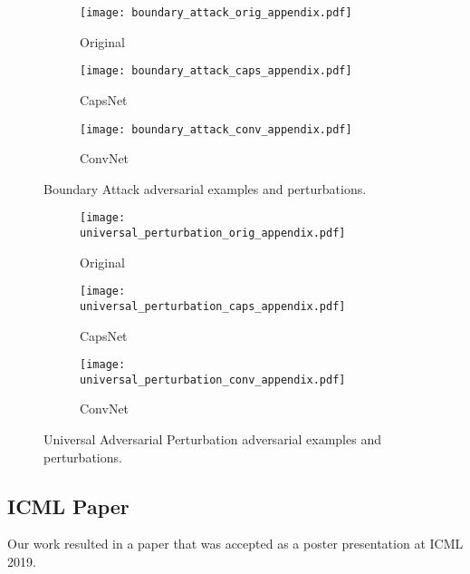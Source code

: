 \begin{figure}
	\centering
	
	\begin{subfigure}{.23\textwidth}
		\centering
		\texttt{[image: boundary\_attack\_orig\_appendix.pdf]}%
		\caption{Original}%
	\end{subfigure}%
	\begin{subfigure}{.36\textwidth}
		\centering
		\texttt{[image: boundary\_attack\_caps\_appendix.pdf]}%
		\caption{CapsNet}
	\end{subfigure}%
	\begin{subfigure}{.36\textwidth}
		\centering
		\texttt{[image: boundary\_attack\_conv\_appendix.pdf]}%
		\caption{ConvNet}
	\end{subfigure}
	\caption[Boundary Attack Adversarial Examples]{Boundary Attack adversarial examples and perturbations.}
	\label{fig:boundary-img}
	
\end{figure}

\begin{figure}
	\centering
	
	\begin{subfigure}{.23\textwidth}
		\centering
		\texttt{[image: universal\_perturbation\_orig\_appendix.pdf]}%
		\caption{Original}%
	\end{subfigure}%
	\begin{subfigure}{.36\textwidth}
		\centering
		\texttt{[image: universal\_perturbation\_caps\_appendix.pdf]}%
		\caption{CapsNet}
	\end{subfigure}%
	\begin{subfigure}{.36\textwidth}
		\centering
		\texttt{[image: universal\_perturbation\_conv\_appendix.pdf]}%
		\caption{ConvNet}
	\end{subfigure}
	\caption[Universal Adversarial Perturbation Adversarial Examples]{Universal Adversarial Perturbation adversarial examples and perturbations.}
	\label{fig:universal-img}
	
\end{figure}

\subsection{ICML Paper}

Our work resulted in a paper \citep*{mine} that was accepted as a poster presentation at ICML 2019.


